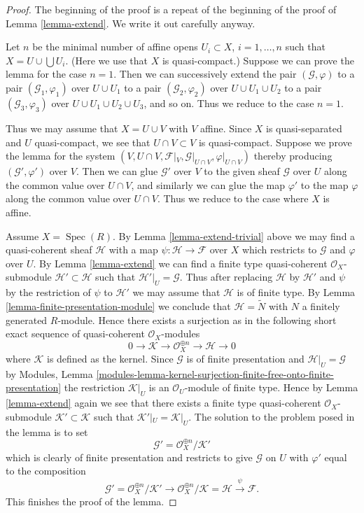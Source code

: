 \documentclass[10pt,a4paper]{amsart}
\theoremstyle{plain}
\theoremstyle{definition}
\theoremstyle{remark}
\numberwithin{equation}{subsection}
\def\Spec{\mathop{\mathrm{Spec}}}
\begin{document}
\begin{proof}
The beginning of the proof is a repeat of the beginning of the
proof of Lemma \ref{lemma-extend}. We write it out carefully anyway.

\medskip\noindent
Let $n$ be the minimal number of affine opens $U_i \subset X$,
$i = 1, \ldots , n$ such that $X = U \cup \bigcup U_i$.
(Here we use that $X$ is quasi-compact.) Suppose
we can prove the lemma for the case $n = 1$. Then we can successively
extend the pair $(\mathcal{G}, \varphi)$
to a pair $(\mathcal{G}_1, \varphi_1)$ over $U \cup U_1$
to a pair $(\mathcal{G}_2, \varphi_2)$ over $U \cup U_1 \cup U_2$
to a pair $(\mathcal{G}_3, \varphi_3)$ over $U \cup U_1 \cup U_2 \cup U_3$,
and so on.
Thus we reduce to the case $n = 1$.

\medskip\noindent
Thus we may assume that $X = U \cup V$ with $V$ affine.
Since $X$ is quasi-separated and $U$ quasi-compact,
we see that $U \cap V \subset V$ is quasi-compact.
Suppose we prove the lemma for the system
$(V, U \cap V, \mathcal{F}|_V, \mathcal{G}|_{U \cap V}, \varphi|_{U \cap V})$
thereby producing $(\mathcal{G}', \varphi')$ over $V$.
Then we can glue $\mathcal{G}'$ over $V$ to the given sheaf $\mathcal{G}$
over $U$ along the common value over $U \cap V$, and similarly we can glue
the map $\varphi'$ to the map $\varphi$ along the common value over
$U \cap V$. Thus we reduce to the case where $X$ is affine.

\medskip\noindent
Assume $X = \Spec(R)$.
By Lemma \ref{lemma-extend-trivial} above we may
find a quasi-coherent sheaf $\mathcal{H}$ with
a map $\psi : \mathcal{H} \to \mathcal{F}$ over $X$
which restricts to $\mathcal{G}$ and $\varphi$ over $U$.
By Lemma \ref{lemma-extend} we can find a finite type
quasi-coherent $\mathcal{O}_X$-submodule
$\mathcal{H}' \subset \mathcal{H}$
such that $\mathcal{H}'|_U = \mathcal{G}$. Thus after
replacing $\mathcal{H}$ by $\mathcal{H}'$
and $\psi$ by the restriction of $\psi$ to $\mathcal{H}'$
we may assume that $\mathcal{H}$ is of finite type.
By Lemma \ref{lemma-finite-presentation-module}
we conclude that $\mathcal{H} = \widetilde{N}$ with
$N$ a finitely generated $R$-module. Hence there exists a surjection
as in the following short exact sequence of
quasi-coherent $\mathcal{O}_X$-modules
$$
0 \to \mathcal{K} \to \mathcal{O}_X^{\oplus n} \to \mathcal{H} \to 0
$$
where $\mathcal{K}$ is defined as the kernel.
Since $\mathcal{G}$ is of finite presentation and
$\mathcal{H}|_U = \mathcal{G}$ by
Modules, Lemma
\ref{modules-lemma-kernel-surjection-finite-free-onto-finite-presentation}
the restriction $\mathcal{K}|_U$ is
an $\mathcal{O}_U$-module of finite type. Hence by Lemma \ref{lemma-extend}
again we see that there exists a finite type quasi-coherent
$\mathcal{O}_X$-submodule $\mathcal{K}' \subset \mathcal{K}$ such
that $\mathcal{K}'|_U = \mathcal{K}|_U$. The solution to the problem
posed in the lemma is to set
$$
\mathcal{G}' = \mathcal{O}_X^{\oplus n}/\mathcal{K}'
$$
which is clearly of finite presentation and restricts to give $\mathcal{G}$
on $U$ with $\varphi'$ equal to the composition
$$
\mathcal{G}' = \mathcal{O}_X^{\oplus n}/\mathcal{K}'
\to \mathcal{O}_X^{\oplus n}/\mathcal{K} = \mathcal{H} \xrightarrow{\psi}
\mathcal{F}.
$$
This finishes the proof of the lemma.
\end{proof}
\end{document}
